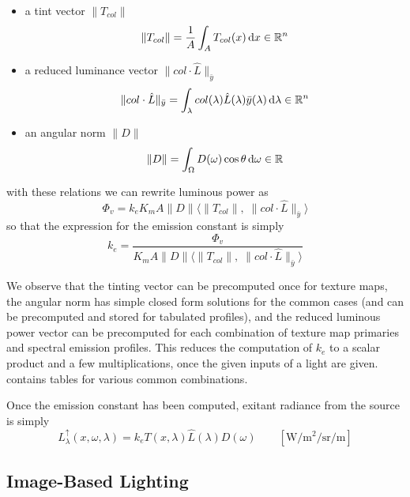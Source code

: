 \begin{itemize}
\item a tint vector $\|T_{col}\|$
\begin{equation}
\|T_{col}\|  = \frac1A\int_A T_{col}(x) \mathop{}\!\mathrm{d} x \in \mathbb{R}^n
\end{equation}
\item a reduced luminance vector $\|col \cdot \hat{L}\|_{\bar y}$
\begin{equation}
\|col \cdot \hat{L}\|_{\bar y} = \int_\lambda col(\lambda) \hat{L}(\lambda)
\bar{y}(\lambda) \mathop{}\!\mathrm{d}\lambda \in \mathbb{R}^n
\end{equation}
\item an angular norm $\|D\|$
\begin{equation}
 \|D\| = \int_\Omega D(\omega) \cos\theta \mathop{}\!\mathrm{d}\omega \in \mathbb{R}
\end{equation}
\end{itemize}
with these relations we can rewrite luminous power as
\begin{equation}
\Phi_v = k_e K_m A \|D\| \big\langle \|T_{col}\|,\; \|col\cdot \hat{L}\|_{\bar
y} \big\rangle
\end{equation}
so that the expression for the emission constant is simply
\begin{equation}
 k_e = \frac{\Phi_v}{K_m A \|D\| \big\langle \|T_{col}\|,\; \|col\cdot \hat{L}\|_{\bar y} \big\rangle }
\end{equation}

We observe that the tinting vector can be precomputed once for texture maps, the
angular norm has simple closed form solutions for the common cases (and can be
precomputed and stored for tabulated profiles), and the reduced luminous power
vector can be precomputed for each combination of texture map primaries and
spectral emission profiles.
This reduces the computation of $k_e$ to a scalar product and a few
multiplications, once the given inputs of a light are given.
 contains tables for various common combinations.

Once the emission constant has been computed, exitant radiance from the source
is simply
\begin{equation}
L^\uparrow_{\lambda}(x, \omega, \lambda) = k_e T(x, \lambda) \hat{L}(\lambda)
D(\omega)
\qquad \left[\si{\watt\per\square\meter\per\steradian\per\meter}\right]
\end{equation}


\subsection{Image-Based Lighting}

